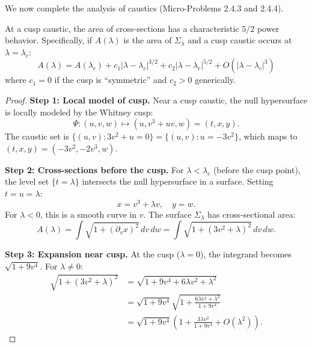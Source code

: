 We now complete the analysis of caustics (Micro-Problems 2.4.3 and 2.4.4).

\begin{theorem}\label{thm:cusparea}
At a cusp caustic, the area of cross-sections has a characteristic $5/2$ power behavior. Specifically, if $A(\lambda)$ is the area of $\Sigma_\lambda$ and a cusp caustic occurs at $\lambda = \lambda_c$:
\begin{equation}
    A(\lambda) = A(\lambda_c) + c_1|\lambda - \lambda_c|^{3/2} + c_2|\lambda - \lambda_c|^{5/2} + O(|\lambda - \lambda_c|^3)
\end{equation}
where $c_1 = 0$ if the cusp is ``symmetric'' and $c_2 > 0$ generically.
\end{theorem}

\begin{proof}
\textbf{Step 1: Local model of cusp.}
Near a cusp caustic, the null hypersurface is locally modeled by the Whitney cusp:
\begin{equation}
    \Psi: (u, v, w) \mapsto (u, v^3 + uv, w) = (t, x, y).
\end{equation}
The caustic set is $\{(u, v) : 3v^2 + u = 0\} = \{(u, v) : u = -3v^2\}$, which maps to $(t, x, y) = (-3v^2, -2v^3, w)$.

\textbf{Step 2: Cross-sections before the cusp.}
For $\lambda < \lambda_c$ (before the cusp point), the level set $\{t = \lambda\}$ intersects the null hypersurface in a surface. Setting $t = u = \lambda$:
\begin{equation}
    x = v^3 + \lambda v, \quad y = w.
\end{equation}
For $\lambda < 0$, this is a smooth curve in $v$. The surface $\Sigma_\lambda$ has cross-sectional area:
\begin{equation}
    A(\lambda) = \int \sqrt{1 + (\partial_v x)^2} \, dv \, dw = \int \sqrt{1 + (3v^2 + \lambda)^2} \, dv \, dw.
\end{equation}

\textbf{Step 3: Expansion near cusp.}
At the cusp ($\lambda = 0$), the integrand becomes $\sqrt{1 + 9v^4}$. For $\lambda \neq 0$:
\begin{align}
    \sqrt{1 + (3v^2 + \lambda)^2} &= \sqrt{1 + 9v^4 + 6\lambda v^2 + \lambda^2} \\
    &= \sqrt{1 + 9v^4}\sqrt{1 + \frac{6\lambda v^2 + \lambda^2}{1 + 9v^4}} \\
    &= \sqrt{1 + 9v^4}\left(1 + \frac{3\lambda v^2}{1 + 9v^4} + O(\lambda^2)\right).
\end{align}


\end{proof}
